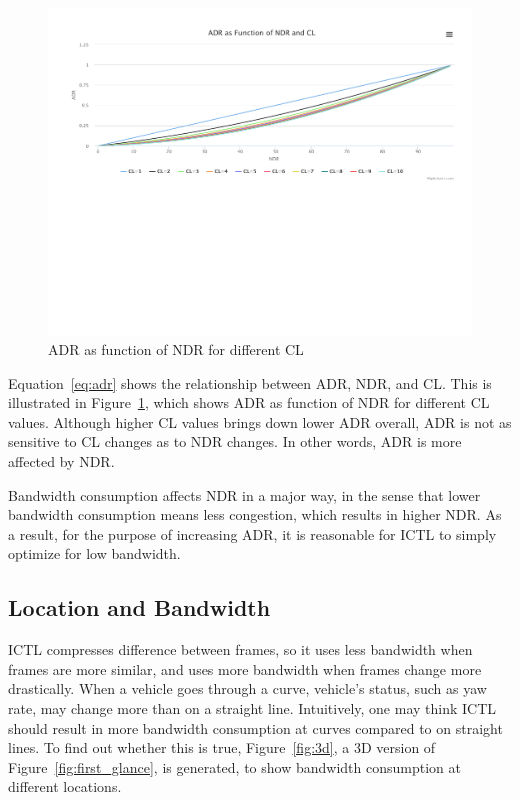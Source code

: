 \documentclass[12pt]{report}
\begin{document}
\begin{figure}[h]
  \begin{center}
    \includegraphics[width=\textwidth]{figures/adr.pdf}
    \caption{\label{fig:adr}ADR as function of NDR for different CL}
  \end{center}
\end{figure}

Equation~\ref{eq:adr} shows the relationship between ADR, NDR, and CL. This is illustrated in Figure~\ref{fig:adr}, which shows ADR as function of NDR for different CL values. Although higher CL values brings down lower ADR overall, ADR is not as sensitive to CL changes as to NDR changes. In other words, ADR is more affected by NDR.

Bandwidth consumption affects NDR in a major way, in the sense that lower bandwidth consumption means less congestion, which results in higher NDR. As a result, for the purpose of increasing ADR, it is reasonable for ICTL to simply optimize for low bandwidth.

\subsection{Location and Bandwidth}

ICTL compresses difference between frames, so it uses less bandwidth when frames are more similar, and uses more bandwidth when frames change more drastically. When a vehicle goes through a curve, vehicle's status, such as yaw rate, may change more than on a straight line. Intuitively, one may think ICTL should result in more bandwidth consumption at curves compared to on straight lines. To find out whether this is true, Figure~\ref{fig:3d}, a 3D version of Figure~\ref{fig:first_glance}, is generated, to show bandwidth consumption at different locations.
\end{document}
